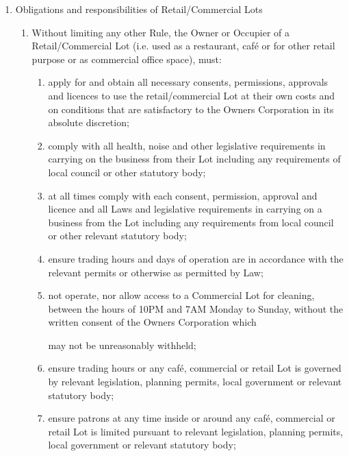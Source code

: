 \documentclass{article}
\begin{document}
\begin{enumerate}[label=\arabic*.]
\begin{enumerate}[label=\arabic{enumi}.\arabic*.]
\item  Obligations and responsibilities of Retail/Commercial Lots

\begin{enumerate}[label=(\arabic*)]

\item  Without limiting any other Rule, the Owner or Occupier of a Retail/Commercial Lot (i.e. used as a restaurant, café or for other retail purpose or as commercial office space), must:

\begin{enumerate}[label=(\alph*)]

\item  apply for and obtain all necessary consents, permissions, approvals and licences to use the retail/commercial Lot at their own costs and on conditions that are satisfactory to the Owners Corporation in its absolute discretion;

\item  comply with all health, noise and other legislative requirements in carrying on the business from their Lot including any requirements of local council or other statutory body;

\item  at all times comply with each consent, permission, approval and licence and all Laws and legislative requirements in carrying on a business from the Lot including any requirements from local council or other relevant statutory body;

\item  ensure trading hours and days of operation are in accordance with the relevant permits or otherwise as permitted by Law;

\item  not operate, nor allow access to a Commercial Lot for cleaning, between the hours of 10PM and 7AM Monday to Sunday, without the written consent of the Owners Corporation which
\newpage

may not be unreasonably withheld;

\item  ensure trading hours or any café, commercial or retail Lot is governed by relevant legislation, planning permits, local government or relevant statutory body;

\item  ensure patrons at any time inside or around any café, commercial or retail Lot is limited pursuant to relevant legislation, planning permits, local government or relevant statutory body;


\end{enumerate}
\end{enumerate}
\end{enumerate}
\end{enumerate}
\end{document}
